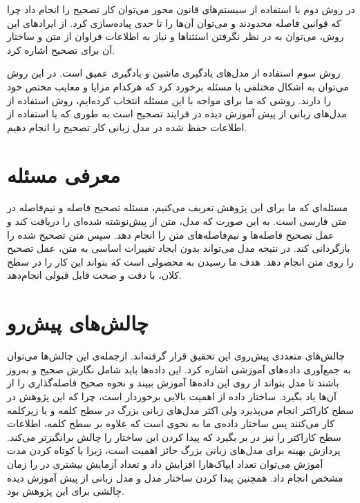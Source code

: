 در روش دوم با استفاده از سیستم‌های قانون محور می‌توان کار تصحیح‌ را انجام داد چرا که قوانین فاصله محدودند و می‌توان  آن‌ها را تا حدی پیاده‌سازی کرد. از ایرادهای این روش، می‌توان به در نظر نگرفتن استثناها و نیاز به اطلاعات فراوان از متن و ساختار آن برای تصحیح اشاره کرد.

روش سوم استفاده از مدل‌های یادگیری ماشین و یادگیری عمیق است. در این روش می‌توان به اشکال مختلفی با مسئله برخورد کرد که هرکدام مزایا و معایب مختص خود را دارند. روشی که ما برای مواجه با این مسئله انتخاب کرده‌ایم، روش استفاده از مد‌ل‌های زبانی از پیش آموزش دیده در فرایند تصحیح است به طوری که با استفاده از اطلاعات حفظ شده در مدل زبانی کار‌ تصحیح‌ را انجام دهیم.

\section{معرفی مسئله}
\hspace{30pt}
مسئله‌ای که ما برای این پژوهش تعریف می‌کنیم، مسئله تصحیح فاصله و نیم‌فاصله در متن فارسی است. به این صورت که مدل، متن از پیش‌نوشته شده‌ای را دریافت کند و عمل تصحیح فاصله‌ها و نیم‌فاصله‌های متن را انجام دهد. سپس متن تصحیح شده را بازگردانی کند. در نتیجه مدل می‌تواند بدون ایجاد تغییرات اساسی به متن، عمل تصحیح را روی متن انجام دهد. هدف ما رسیدن به محصولی است که بتواند این کار را در سطح کلان، با دقت و صحت قابل قبولی انجام‌دهد.

\section{چالش‌های پیش‌رو}
\hspace{30pt}
چالش‌های متعددی پیش‌روی این تحقیق قرار گرفته‌اند. ازجمله‌ی این چالش‌ها می‌توان به جمع‌آوری داد‌ه‌های آموزشی اشاره کرد. این داده‌ها باید شامل نگارش صحیح و به‌روز باشند تا مدل بتواند از روی این داده‌ها آموزش ببیند و نحوه صحیح فاصله‌گذاری را از آن‌ها یاد بگیرد. ساختار داده از اهمیت بالایی برخوردار است، چرا که این پژوهش در سطح کاراکتر انجام می‌پذیرد ولی اکثر مدل‌های زبانی بزرگ در سطح کلمه و یا زیر‌کلمه کار می‌کنند پس ساختار داده‌ی ما به نحوی است که علاوه بر سطح کلمه، اطلاعات سطح کاراکتر را نیز در بر بگیرد که پیدا کردن این ساختار را چالش برانگیزتر می‌کند. پردازش بهینه برای مدل‌های زبانی بزرگ حائز اهمیت است، زیرا با کوتاه کردن مدت آموزش می‌توان تعداد ایپاک‌هارا افزایش داد و تعداد آزمایش بیشتری در را زمان مشخص انجام داد. همچنین پیدا کردن ساختار مدل و مدل زبانی از پیش آموزش دیده چالشی برای این پژوهش بود.

